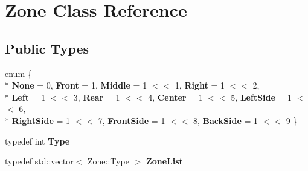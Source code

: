 \hypertarget{classZone}{\section{Zone Class Reference}
\label{classZone}
}
\subsection*{Public Types}
\begin{DoxyCompactItemize}
\item 
\hypertarget{classZone_a03a1f8b6aca53a4c01da1fc39f98af93}{enum \{ \\*
{\bfseries None} = 0, 
{\bfseries Front} = 1, 
{\bfseries Middle} = 1 $<$$<$ 1, 
{\bfseries Right} = 1 $<$$<$ 2, 
\\*
{\bfseries Left} = 1 $<$$<$ 3, 
{\bfseries Rear} = 1 $<$$<$ 4, 
{\bfseries Center} = 1 $<$$<$ 5, 
{\bfseries Left\+Side} = 1 $<$$<$ 6, 
\\*
{\bfseries Right\+Side} = 1 $<$$<$ 7, 
{\bfseries Front\+Side} = 1 $<$$<$ 8, 
{\bfseries Back\+Side} = 1 $<$$<$ 9
 \}}\label{classZone_a03a1f8b6aca53a4c01da1fc39f98af93}

\item 
\hypertarget{classZone_aed09846f4b80c8f6eb07546a097e75df}{typedef int {\bfseries Type}}\label{classZone_aed09846f4b80c8f6eb07546a097e75df}

\item 
\hypertarget{classZone_af029d87e3a91882fef565ea1c0a9a0f1}{typedef std\+::vector$<$ Zone\+::\+Type $>$ {\bfseries Zone\+List}}\label{classZone_af029d87e3a91882fef565ea1c0a9a0f1}

\end{DoxyCompactItemize}

